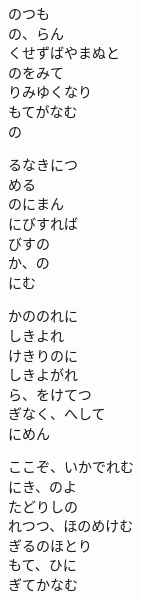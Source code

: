 \documentclass[10pt,b5j]{tarticle} %
\begin{document}
\begin{enumerate}
\begin{minipage}[c]{\blocksize}
        \vspace{\linespace}
        \item
        のつも\\
        の、らん\\
        くせずばやまぬと\\
        のをみて\\
        りみゆくなり\\
        もてがなむ\\
        の
        
        \vspace{\linespace}
        \item
        るなきにつ\\
        める\\
        のにまん\\
        にびすれば\\
        びすの\\
        か、の\\
        にむ
        
        \vspace{\linespace}
        \item
        かののれに\\
        しきよれ\\
        けきりのに\\
        しきよがれ\\
        ら、をけてつ\\
        ぎなく、へして\\
        にめん
        
        \vspace{\linespace}
        \item
        ここぞ、いかでれむ\\
        にき、のよ\\
        たどりしの\\
        れつつ、ほのめけむ\\
        ぎるのほとり\\
        もて、ひに\\
        ぎてかなむ
    
    \end{minipage}
\end{enumerate} %
\end{document}
